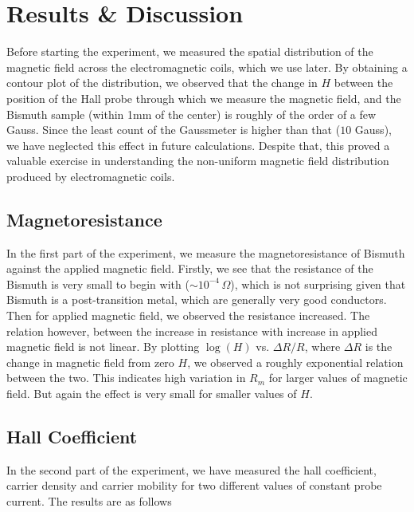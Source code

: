 \section{Results \& Discussion}

Before starting the experiment, we measured the spatial distribution of the magnetic field across the electromagnetic coils, which we use later.
By obtaining a contour plot of the distribution, we observed that the change in $H$ between the position of the Hall probe through which we measure the magnetic field, and the Bismuth sample (within 1mm of the center) is roughly of the order of a few Gauss. Since the least count of the Gaussmeter is higher than that ($10 $ Gauss), we have neglected this effect in future calculations. Despite that, this proved a valuable exercise in understanding the non-uniform magnetic field distribution produced by electromagnetic coils. \vspace{-1em}

\subsection*{Magnetoresistance}

In the first part of the experiment, we measure the magnetoresistance of Bismuth against the applied magnetic field. Firstly, we see that the resistance of the Bismuth is very small to begin with ($\sim 10^{-4}\,\Omega$), which is not surprising given that Bismuth is a post-transition metal, which are generally  very good conductors. Then for applied magnetic field, we observed the resistance increased. The relation however, between the increase in resistance with increase in applied magnetic field is not linear. By plotting $\log(H)$ vs. $\Delta R/R$, where $\Delta R$ is the change in magnetic field from zero $H$, we observed a roughly exponential relation between the two. This indicates high variation in $R_m$ for larger values of magnetic field. But again the effect is very small for smaller values of $H$. 

\subsection*{Hall Coefficient}
In the second part of the experiment, we have measured the hall coefficient, carrier density and carrier mobility for two different values of constant probe current. The results are as follows

